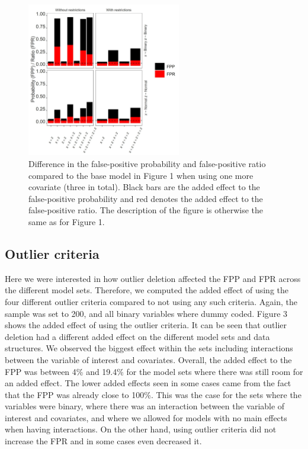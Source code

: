 \begin{figure}[hbt!]
\includegraphics[width=0.6\textwidth]{R/Analysis/Result/Figures/Figure1C.jpeg}
\centering
\caption{Difference in the false-positive probability and false-positive ratio compared to the base model in Figure 1 when using one more covariate (three in total). Black bars are the added effect to the false-positive probability and red denotes the added effect to the false-positive ratio. The description of the figure is otherwise the same as for Figure 1.}
\label{fig:mainfigure}
\end{figure}

\subsection{Outlier criteria}
Here we were interested in how outlier deletion affected the FPP and FPR across the different model sets. Therefore, we computed the added effect of using the four different outlier criteria compared to not using any such criteria. Again, the sample was set to 200, and all binary variables where dummy coded. Figure 3 shows the added effect of using the outlier criteria. It can be seen that outlier deletion had a different added effect on the different model sets and data structures. We observed the biggest effect within the sets including interactions between the variable of interest and covariates. Overall, the added effect to the FPP was between 4\% and 19.4\% for the model sets where there was still room for an added effect. The lower added effects seen in some cases came from the fact that the FPP was already close to 100\%. This was the case for the sets where the variables were binary, where there was an interaction between the variable of interest and covariates, and where we allowed for models with no main effects when having interactions. On the other hand, using outlier criteria did not increase the FPR and in some cases even decreased it. 

